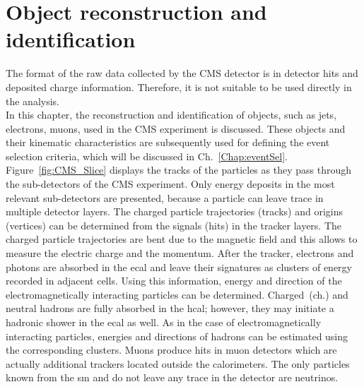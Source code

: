 \chapter{Object reconstruction and identification}
\label{Ch:ObjectsDef}
The format of the raw data collected by the CMS detector is in detector hits and deposited charge information. Therefore, it is not suitable to be used directly in the  analysis.\\
In this chapter, the reconstruction and identification of objects, such as jets, electrons, muons, used in the CMS experiment is discussed.
These objects and their kinematic characteristics are subsequently used for defining the event selection criteria, which will be discussed in Ch.~\ref{Chap:eventSel}.\\
Figure~\ref{fig:CMS_Slice} displays the tracks of the particles as they pass through the sub-detectors of the CMS experiment. Only energy deposits in the most relevant sub-detectors are presented, because a particle can leave trace in multiple detector layers.
The charged particle trajectories (tracks) and origins (vertices) can be determined from the signals (hits) in the tracker layers.
The charged particle trajectories are bent due to the magnetic field and this allows to measure the electric charge and the momentum.
After the tracker, electrons and photons are absorbed in the \acrshort{ecal} and leave their signatures as clusters of energy recorded in adjacent cells. Using this information, energy and direction of the electromagnetically interacting particles can be determined. Charged~(ch.) and neutral hadrons are fully absorbed in the \acrshort{hcal}; however, they may initiate a hadronic shower in the \acrshort{ecal} as well. As in the case of electromagnetically interacting particles, energies and directions of hadrons can be estimated using the corresponding clusters. Muons produce hits in muon detectors which are actually additional trackers located outside the calorimeters.
The only particles known from the \acrshort{sm} and do not leave any trace in the detector are neutrinos.\\
